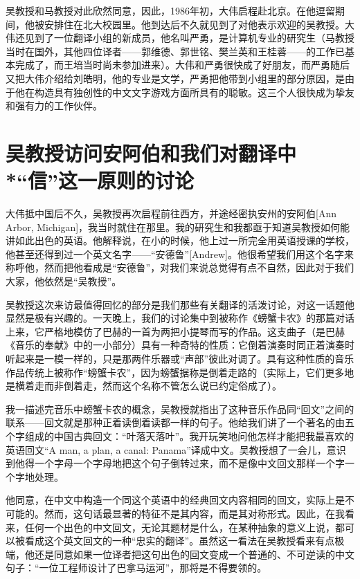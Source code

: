 吴教授和马教授对此欣然同意，因此，1986年初，大伟启程赴北京。在他逗留期间，他被安排住在北大校园里。他到达后不久就见到了对他表示欢迎的吴教授。大伟还见到了一位翻译小组的新成员，他名叫严勇，是计算机专业的研究生（马教授当时在国外，其他四位译者——郭维德、郭世铭、樊兰英和王桂蓉——的工作已基本完成了，而王培当时尚未参加进来）。大伟和严勇很快成了好朋友，而严勇随后又把大伟介绍给刘皓明，他的专业是文学，严勇把他带到小组里的部分原因，是由于他在构造具有独创性的中文文字游戏方面所具有的聪敏。这三个人很快成为挚友和强有力的工作伙伴。

\section*{吴教授访问安阿伯和我们对翻译中\\*“信”这一原则的讨论}

大伟抵中国后不久，吴教授再次启程前往西方，并途经密执安州的安阿伯[Ann Arbor, Michigan]，我当时就住在那里。我的研究生和我都亟于知道吴教授如何能讲如此出色的英语。他解释说，在小的时候，他上过一所完全用英语授课的学校，他甚至还得到过一个英文名字——“安德鲁”[Andrew]。他很希望我们用这个名字来称呼他，然而把他看成是“安德鲁”，对我们来说总觉得有点不自然，因此对于我们大家，他依然是“吴教授”。

吴教授这次来访最值得回忆的部分是我们那些有关翻译的活泼讨论，对这一话题他显然是极有兴趣的。一天晚上，我们的讨论集中到被称作《螃蟹卡农》的那篇对话上来，它严格地模仿了巴赫的一首为两把小提琴而写的作品。这支曲子（是巴赫《音乐的奉献》中的一小部分）具有一种奇特的性质：它倒着演奏时同正着演奏时听起来是一模一样的，只是那两件乐器或“声部”彼此对调了。具有这种性质的音乐作品传统上被称作“螃蟹卡农”，因为螃蟹据称是倒着走路的（实际上，它们更多地是横着走而非倒着走，然而这个名称不管怎么说已约定俗成了）。

我一描述完音乐中螃蟹卡农的概念，吴教授就指出了这种音乐作品同“回文”之间的联系——回文就是那种正着读倒着读都一样的句子。他给我们讲了一个著名的由五个字组成的中国古典回文：“叶落天落叶”。我开玩笑地问他怎样才能把我最喜欢的英语回文“A man, a plan, a canal: Panama”译成中文。吴教授想了一会儿，意识到他得一个字母一个字母地把这个句子倒转过来，而不是像中文回文那样一个字一个字地处理。

他同意，在中文中构造一个同这个英语中的经典回文内容相同的回文，实际上是不可能的。然而，这句话最显著的特征不是其内容，而是其对称形式。因此，在我看来，任何一个出色的中文回文，无论其题材是什么，在某种抽象的意义上说，都可以被看成这个英文回文的一种“忠实的翻译”。虽然这一看法在吴教授看来有点极端，他还是同意如果一位译者把这句出色的回文变成一个普通的、不可逆读的中文句子：“一位工程师设计了巴拿马运河”，那将是不得要领的。

